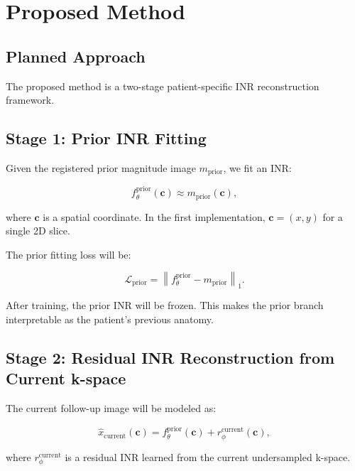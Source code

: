 \documentclass[11pt,a4paper]{article}
\begin{document}
\section{Proposed Method}

\subsection{Planned Approach}

The proposed method is a two-stage patient-specific INR reconstruction framework.

\subsection{Stage 1: Prior INR Fitting}

Given the registered prior magnitude image $m_{\mathrm{prior}}$, we fit an INR:

\begin{equation}
    f_{\theta}^{\mathrm{prior}}(\mathbf{c})
    \approx
    m_{\mathrm{prior}}(\mathbf{c}),
\end{equation}

where $\mathbf{c}$ is a spatial coordinate. In the first implementation, $\mathbf{c}=(x,y)$ for a single 2D slice.

The prior fitting loss will be:

\begin{equation}
    \mathcal{L}_{\mathrm{prior}}
    =
    \left\|
    f_{\theta}^{\mathrm{prior}}
    -
    m_{\mathrm{prior}}
    \right\|_1.
\end{equation}

After training, the prior INR will be frozen. This makes the prior branch interpretable as the patient's previous anatomy.

\subsection{Stage 2: Residual INR Reconstruction from Current k-space}

The current follow-up image will be modeled as:

\begin{equation}
    \hat{x}_{\mathrm{current}}(\mathbf{c})
    =
    f_{\theta}^{\mathrm{prior}}(\mathbf{c})
    +
    r_{\phi}^{\mathrm{current}}(\mathbf{c}),
\end{equation}

where $r_{\phi}^{\mathrm{current}}$ is a residual INR learned from the current undersampled k-space.
\end{document}
